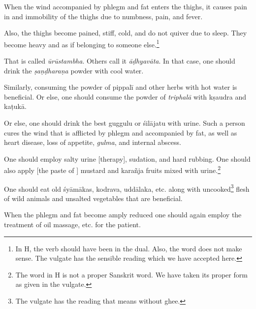 \begin{translation}
\begin{tt}
\item[31]

\begin{sloka}
When the wind accompanied by phlegm and fat enters the thighs, it
causes pain in and immobility of the thighs due to numbness, pain, and
fever.
\end{sloka}

\item[32]

\begin{sloka}
Also, the thighs become pained, stiff, cold, and do not quiver due to
sleep. They become heavy and as if belonging to someone
else.\footnote{In H, the verb  should have been in the
    dual. Also, the word  does not make sense. The vulgate
    has the sensible reading  which we have accepted here.}
\end{sloka}

\item[33]

\begin{sloka}
That is called \textit{ūrūstambha}. Others call it \textit{āḍhyavāta}.
In that case, one should drink the \textit{ṣaṇḍharaṇa} powder with
cool water.
\end{sloka}

\item[34]

\begin{sloka}
Similarly, consuming the powder of \gls{pippalī} and other herbs with
hot water is beneficial. Or else, one should consume the powder of
\textit{triphalā} with \gls{kṣaudra} and \gls{kaṭukā}.
\end{sloka}

\item[35-38]

\begin{sloka}
Or else, one should drink the best \gls{guggulu} or \gls{śilājatu}
with urine. Such a person cures the wind that is afflicted by phlegm
and accompanied by fat, as well as heart disease, loss of appetite,
\textit{gulma}, and internal abscess.

One should employ salty urine [therapy], sudation, and hard rubbing.
One should also apply [the paste of ] mustard and \gls{karañja} fruits
mixed with urine.\footnote{The word  in H is not a proper
    Sanskrit word. We have taken its proper form  as given in
    the vulgate.}

One should eat old \gls{śyāmāka}s, \gls{kodrava}, \gls{uddālaka}, etc.
along with uncooked\footnote{The vulgate has the reading
     that means without ghee.} flesh of wild animals and
    unsalted vegetables that are beneficial.
\end{sloka}

\item[39]

\begin{sloka}
When the phlegm and fat become amply reduced one should again employ
the treatment of oil massage, etc. for the patient.
\end{sloka}
\end{tt}

\end{translation}
